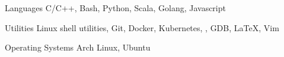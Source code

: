 
\vspace{-0.3cm}


\begin{cvskills}


  \cvskill
  {Languages}
  {C/C++, Bash, Python, Scala, Golang, Javascript}


  \cvskill
  {Utilities}
  {Linux shell utilities, Git, Docker, Kubernetes, , GDB, \LaTeX, Vim}


  \cvskill
  {Operating Systems}
  {Arch Linux, Ubuntu}


\end{cvskills}
